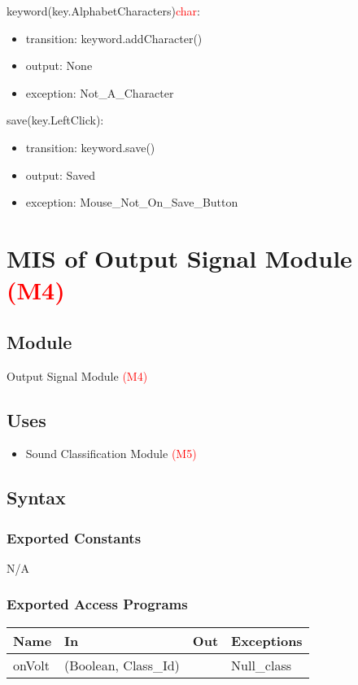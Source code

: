 \documentclass[12pt, titlepage]{article}
\begin{document}
\noindent keyword(key.AlphabetCharacters)\textcolor{red}{char}:
\begin{itemize}
\item transition: keyword.addCharacter()
\item output: None
\item exception: Not\_A\_Character 
\end{itemize}

\noindent save(key.LeftClick):
\begin{itemize}
\item transition: keyword.save() 
\item output: Saved
\item exception: Mouse\_Not\_On\_Save\_Button 
\end{itemize}

\newpage 


\section{MIS of Output Signal Module \textcolor{red}{(M4)}} \label{Output Signal Module}
\subsection{Module}
Output Signal Module \textcolor{red}{(M4)}
\subsection{Uses}
\begin{itemize}
  \item Sound Classification Module \textcolor{red}{(M5)}
  \end{itemize}

\subsection{Syntax}

\subsubsection{Exported Constants}
N/A

\subsubsection{Exported Access Programs}

\begin{center}
\begin{tabular}{p{4cm} p{4cm} p{4cm} p{4cm}}
\hline
\textbf{Name} & \textbf{In} & \textbf{Out} & \textbf{Exceptions} \\
\hline
onVolt & (Boolean, Class\_Id) &  & Null\_class\\
\hline
\end{tabular}
\end{center}
\end{document}
